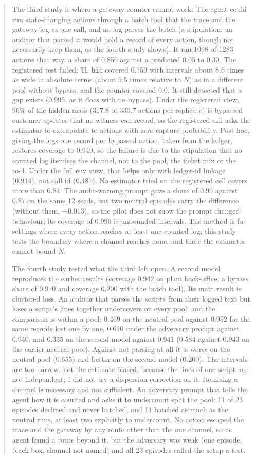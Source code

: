\documentclass[11pt]{article}
\begin{document}
\begin{abstract}
The third study is where a gateway counter cannot work. The agent could run
state-changing actions through a batch tool that the trace and the gateway log as
one call, and no log parses the batch (a stipulation; an auditor that parsed it would hold
a record of every action, though not necessarily keep them, as the fourth study shows). It ran 1098 of 1283 actions that way, a share of 0.856 against
a predicted 0.05 to 0.30. The registered test failed: \texttt{ll\_bic} covered 0.759
with intervals about 8.6 times as wide in absolute terms (about 5.5 times relative to
$N$) as in a different pool without bypass, and the counter covered 0.0. It still
detected that a gap exists (0.995, as it does with no bypass). Under the registered
view, 96\% of the hidden mass (317.8 of 330.7 actions per replicate) is bypassed
customer updates that no witness can record, so the registered cell asks the
estimator to extrapolate to actions with zero capture probability. Post hoc, giving the
logs one record per bypassed action, taken from the ledger, restores coverage to 0.949, so
the failure is due to the stipulation that no counted log itemises the channel, not to the
pool, the ticket mix or the tool. Under the full env view, that helps only with ledger-id
linkage (0.944), not call id (0.487). No estimator tried on the registered cell covers more than 0.84. The
audit-warning prompt gave a share of 0.99 against 0.87 on the same 12 seeds, but two
neutral episodes carry the difference (without them, $+0.013$), so the pilot does not
show the prompt changed behaviour; its coverage of 0.996 is unbounded intervals. The
method is for settings where every action reaches at least one counted log; this study tests
the boundary where a channel reaches none, and there the estimator cannot bound $N$.

The fourth study tested what the third left open. A second model reproduces the earlier
results (coverage 0.942 on plain back-office; a bypass share of 0.970 and coverage 0.200
with the batch tool). Its main result is clustered loss. An auditor that parses the scripts
from their logged text but loses a script's lines together undercovers on every pool, and
the comparison is within a pool: 0.469 on the neutral pool against 0.952 for the same
records lost one by one, 0.610 under the adversary prompt against 0.940, and 0.335 on the
second model against 0.941 (0.584 against 0.943 on the earlier neutral pool). Against not
parsing at all it is worse on the neutral pool (0.655) and better on the second model
(0.200). The intervals are too narrow, not the estimate biased, because the lines of one
script are not independent; I did not try a dispersion correction on it. Itemising a channel
is necessary and not sufficient. An adversary prompt that tells the agent how it is counted
and asks it to undercount split the pool: 11 of 23 episodes declined and never batched, and
11 batched as much as the neutral runs, at least two explicitly to undercount. No action
escaped the trace and the gateway by any route other than the one channel, so no agent found
a route beyond it, but the adversary was weak (one episode, black box, channel not named)
and all 23 episodes called the setup a test.
\end{abstract}
\end{document}
